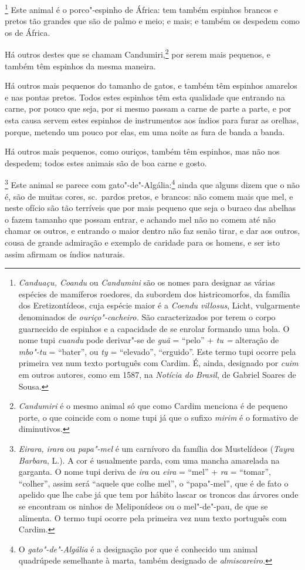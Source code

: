 \begin{linenumbers}
\footnote{ \textit{Canduaçu, Coandu} ou
\textit{Candumini} são os nomes para designar as várias espécies de
mamíferos roedores, da subordem dos histricomorfos, da família dos
Eretizontídeos, cuja espécie maior é a \textit{Coendu villosus}, 
Licht, vulgarmente denominados de \textit{ouriço"-cacheiro.} São
caracterizados por terem o corpo guarnecido de espinhos e a capacidade
de se enrolar formando uma bola. O nome tupi \textit{cuandu} pode
derivar"-se de \textit{guã} = ``pelo'' + \textit{tu =} alteração de
\textit{mbo"-tu} = ``bater'', ou \textit{ty} = ``elevado'', ``erguido''. Este
termo tupi ocorre pela primeira vez num texto português com Cardim. É,
ainda, designado por \textit{cuim} em outros autores, como em 1587, na
\textit{Notícia do Brasil}, de Gabriel Soares de Sousa.} Este
animal é o porco"-espinho de África: tem também espinhos brancos e
pretos tão grandes que são de palmo e meio; e mais; e também os
despedem como os de África.

 Há outros destes que se chamam Candumiri,\footnote{ \textit{Candumiri} 
é o mesmo animal só que como Cardim menciona é de pequeno porte, o
que coincide com o nome tupi já que o sufixo \textit{mirim} é o
formativo de diminutivos.} por serem mais pequenos, e também
têm espinhos da mesma maneira.


 Há outros mais pequenos do tamanho de gatos, e também têm espinhos
amarelos e nas pontas pretos. Todos estes espinhos têm esta qualidade
que entrando na carne, por pouco que seja, por si mesmo passam a carne
de parte a parte, e por esta causa servem estes espinhos de
instrumentos aos índios para furar as orelhas, porque, metendo um pouco
por elas, em uma noite as fura de banda a banda.

 Há outros mais pequenos, como ouriços, também têm espinhos, mas não nos
despedem; todos estes animais são de boa carne e gosto. 

\footnote{ \textit{Eirara, irara} ou
\textit{papa"-mel} é um carnívoro da família dos Mustelídeos
(\textit{Tayra Barbara}, L.). A cor é usualmente parda, com uma mancha
amarelada na garganta. O nome tupi deriva de \textit{ira} ou
\textit{eira} = ``mel'' + \textit{ra} = ``tomar'', ``colher'', assim será ``aquele 
que colhe mel'', o ``papa"-mel'', que é de fato o apelido que 
lhe cabe já que tem por hábito lascar os troncos das árvores onde se
encontram os ninhos de Meliponídeos ou o mel"-de"-pau, de que se
alimenta. O termo tupi ocorre pela primeira vez num texto português com
Cardim.} Este animal se parece com gato"-de"-Algália:\footnote{ O 
\textit{gato"-de"-Algália} é a designação por que é conhecido um animal
quadrúpede semelhante à marta, também designado de
\textit{almiscareiro.}} ainda que alguns dizem que o não é, são de
muitas cores, sc.~pardos pretos, e brancos: não comem mais que mel, e
neste ofício são tão terríveis que por mais pequeno que seja o buraco
das abelhas o fazem tamanho que possam entrar, e achando mel não no
comem até não chamar os outros, e entrando o maior dentro não faz senão
tirar, e dar aos outros, cousa de grande admiração e exemplo de
caridade para os homens, e ser isto assim afirmam os índios naturais.


\end{linenumbers}
